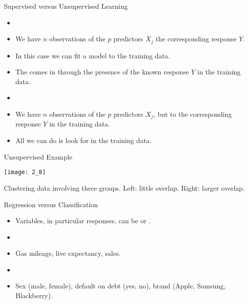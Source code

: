 \documentclass[mathserif, aspectratio=169]{beamer}
\begin{document}
\begin{frame}{Supervised versus Unsupervised Learning}
	\begin{cpage}
		\begin{itemize}
			\item[] 
			\item We have $n$ observations of the $p$ predictors $X_j$ 
				the corresponding response $Y$.
			\item In this case we can fit a model to the training data.
			\item The  comes in through the presence of the known
				response $Y$ in the training data.
			\item[] 
			\item We have $n$ observations of the $p$ predictors $X_j$,
				but  to the corresponding response $Y$ in the training data.
			\item All we can do is look for  in the training data.
		\end{itemize}
	\end{cpage}
\end{frame}

\begin{frame}{Unsupervised Example}
	\vspace{-5mm}
	\begin{center}
		\texttt{[image: 2\_8]}

		Clustering data involving three groups. Left: little overlap. Right: larger overlap.
	\end{center}
\end{frame}

\begin{frame}{Regression versus Classification}
	\begin{itemize}
		\item Variables, in particular responses, can be  or
			.
		\item[] 
		\item Gas mileage, live expectancy, sales. 
		\item[] 
		\item Sex (male, female), default on debt (yes, no), brand (Apple, Samsung, Blackberry).
	\end{itemize}
\end{frame}
\end{document}
